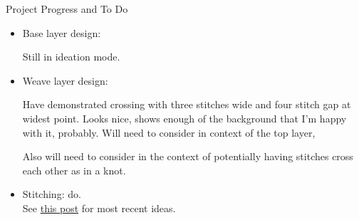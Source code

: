 
			\item Project Progress and To Do %
			\begin{itemize}
				\item Base layer design:
					
				Still in ideation mode.
				\item Weave layer design:
				
Have demonstrated crossing with three stitches wide and four stitch gap at widest point. Looks nice, shows enough of the background that I'm happy with it, probably.
Will need to consider in context of the top layer,
				
Also will need to consider in the context of potentially having stitches cross each other as in a knot. %





				\item Stitching: do. \\ See \href{daily-reflection-2026-08-03}{this post} for most recent ideas.

			\end{itemize}
